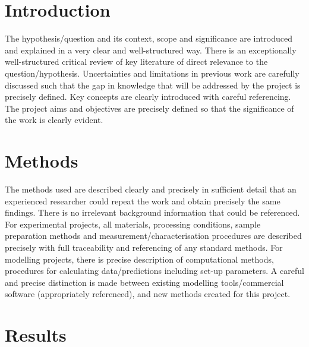 \documentclass{Academic}
\begin{document}
\myabstract{}
\renewcommand{\myTitle}{Title of Paper Here}
\renewcommand{\MyAuthor}{Your Name Here}
\renewcommand{\MyDepartment}{Department Here}
\renewcommand{\ID}{1234567}
\renewcommand{\Keywords}{Keyword 1, Keyword 2, Keyword 3}
\maketitle
\onehalfspacing

\section{Introduction}

The hypothesis/question and its context, scope and significance are introduced and explained in a very clear and well-structured way\supercite{einstein}. 
There is an exceptionally well-structured critical review of key literature of direct relevance to the question/hypothesis. Uncertainties and limitations in previous work are carefully discussed such that the gap in knowledge that will be addressed by the project is precisely defined. 
Key concepts are clearly introduced with careful referencing. 
The project aims and objectives are precisely defined so that the significance of the work is clearly evident.

\section{Methods}

The methods used are described clearly and precisely in sufficient detail that an experienced researcher could repeat the work and obtain precisely the same findings. There is no irrelevant background information that could be referenced.
For experimental projects, all materials, processing conditions, sample preparation methods and measurement/characterisation procedures are described precisely with full traceability and referencing of any standard methods.
 For modelling projects, there is precise description of computational methods, procedures for calculating data/predictions including set-up parameters. A careful and precise distinction is made between existing modelling tools/commercial software (appropriately referenced), and new methods created for this project. 


\section{Results}
\end{document}
